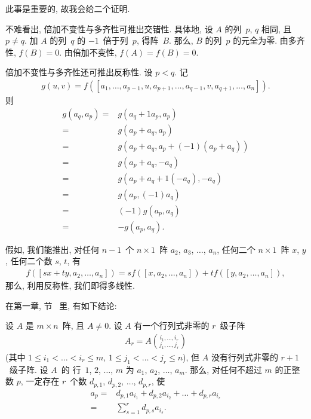 此事是重要的, 故我会给二个证明.

\vspace{2ex}

不难看出, 倍加不变性与多齐性可推出交错性.
具体地, 设 \(A\) 的列~\(p\), \(q\) 相同,
且 \(p \neq q\).
加 \(A\) 的列~\(q\) 的 \(-1\)~倍于列~\(p\),
得阵~\(B\).
那么, \(B\) 的列~\(p\) 的元全为零.
由多齐性, \(f(B) = 0\).
由倍加不变性, \(f(A) = f(B) = 0\).

倍加不变性与多齐性还可推出反称性.
设 \(p < q\).
记
\begin{align*}
    g(u, v)
    = f {([a_1, \dots, a_{p-1}, u, a_{p+1}, \dots,
                    a_{q-1}, v, a_{q+1}, \dots, a_n])}.
\end{align*}
则
\begin{align*}
    g(a_q, a_p)
    = {} & g(a_q + 1a_p, a_p)                   \\
    = {} & g(a_p + a_q, a_p)                    \\
    = {} & g(a_p + a_q, a_p + (-1) (a_p + a_q)) \\
    = {} & g(a_p + a_q, -a_q)                   \\
    = {} & g(a_p + a_q + 1 (-a_q), -a_q)        \\
    = {} & g(a_p, (-1) a_q)                     \\
    = {} & (-1) g(a_p, a_q)                     \\
    = {} & {-g(a_p, a_q)}.
\end{align*}

假如, 我们能推出,
对任何 \(n-1\)~个 \(n \times 1\)~阵
\(a_2\), \(a_3\), \(\dots\), \(a_n\),
任何二个 \(n \times 1\)~阵 \(x\), \(y\),
任何二个数 \(s\), \(t\),
有
\begin{align*}
    f {([sx + ty, a_2, \dots, a_n])}
    =
    s
    f {([x, a_2, \dots, a_n])}
    +
    t
    f {([y, a_2, \dots, a_n])},
\end{align*}
那么, 利用反称性, 我们即得多线性.

在第一章, 节~ 里, 有如下结论:

\begin{theorem}
    设 \(A\) 是 \(m \times n\)~阵,
    且 \(A \neq 0\).
    设 \(A\) 有一个行列式非零的 \(r\)~级子阵
    \begin{align*}
        A_r = A\binom{i_1,\dots,i_r}{j_1,\dots,j_r}
    \end{align*}
    (其中
    \(1 \leq i_1 < \dots < i_r \leq m\),
    \(1 \leq j_1 < \dots < j_r \leq n\)),
    但 \(A\) 没有行列式非零的 \(r+1\)~级子阵.
    设 \(A\)~的%
    行~\(1\), \(2\), \(\dots\), \(m\)
    为 \(a_1\), \(a_2\), \(\dots\), \(a_m\).
    那么, 对任何不超过 \(m\) 的正整数 \(p\),
    一定存在 \(r\)~个数
    \(d_{p,1}\), \(d_{p,2}\), \(\dots\), \(d_{p,r}\),
    使
    \begin{align*}
        a_p
        = {} &
        d_{p,1} a_{i_1}
        + d_{p,2} a_{i_2}
        + \dots
        + d_{p,r} a_{i_r}
        \\
        = {} &
        \sum_{s = 1}^{r} {d_{p,s} a_{i_s}}.
    \end{align*}
\end{theorem}

